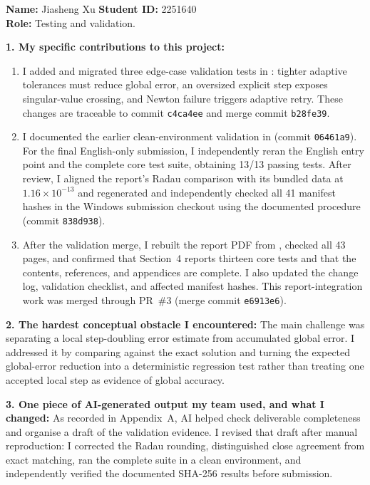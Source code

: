 \begin{formbox}
\textbf{Name:} Jiasheng Xu \hfill \textbf{Student ID:} 2251640\\
\textbf{Role:} Testing and validation.

\textbf{1. My specific contributions to this project:}
\begin{enumerate}[leftmargin=2em,itemsep=0.25em,topsep=0.15em]
    \item I added and migrated three edge-case validation tests in
    : tighter adaptive tolerances must
    reduce global error, an oversized explicit step exposes singular-value
    crossing, and Newton failure triggers adaptive retry.  These changes are
    traceable to commit \texttt{c4ca4ee} and merge commit \texttt{b28fe39}.

    \item I documented the earlier clean-environment validation in
    (commit \texttt{06461a9}).  For the final English-only submission, I
    independently reran the English entry point and the complete core test
    suite, obtaining 13/13 passing tests.  After review, I aligned the report's
    Radau comparison with its bundled data at \(1.16\times10^{-13}\) and
    regenerated and independently checked all 41 manifest hashes in the
    Windows submission checkout using the documented procedure (commit
    \texttt{838d938}).

    \item After the validation merge, I rebuilt the report PDF from
    , checked all 43 pages, and confirmed
    that Section~4 reports thirteen core tests and that the contents, references,
    and appendices are complete.  I also updated the change log, validation
    checklist, and affected manifest hashes.  This report-integration work was
    merged through PR~\#3 (merge commit \texttt{e6913e6}).
\end{enumerate}

\textbf{2. The hardest conceptual obstacle I encountered:} The main challenge
was separating a local step-doubling error estimate from accumulated global
error.  I addressed it by comparing against the exact solution and turning the
expected global-error reduction into a deterministic regression test rather
than treating one accepted local step as evidence of global accuracy.

\textbf{3. One piece of AI-generated output my team used, and what I changed:}
As recorded in Appendix~A, AI helped check deliverable completeness and
organise a draft of the validation evidence.  I revised that draft after manual
reproduction: I corrected the Radau rounding, distinguished close agreement
from exact matching, ran the complete suite in a clean environment, and
independently verified the documented SHA-256 results before submission.


\end{formbox}
